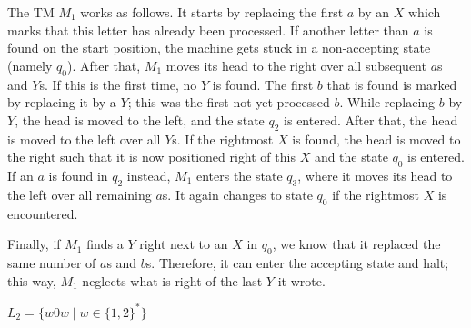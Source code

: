 \documentclass{exercise}
\begin{document}
\begin{solution}
\begin{center}
    \end{center}
    The TM $M_1$ works as follows.  It starts by replacing the first $a$ by an
    $X$ which marks that this letter has already been processed.  If another
    letter than $a$ is found on the start position, the machine gets stuck in a
    non-accepting state (namely $q_0$).  After that, $M_1$ moves its head to the
    right over all subsequent $a$s and $Y$s.  If this is the first time, no $Y$
    is found.  The first $b$ that is found is marked by
    replacing it by a $Y$; this was the first not-yet-processed $b$.  While
    replacing $b$ by $Y$, the head is moved to the left, and the state
    $q_2$ is entered.  After that, the head is moved to the left over all $Y$s.
    If the rightmost $X$ is found, the head is moved to the right such that it
    is now positioned right of this $X$ and the state $q_0$ is entered.
    If an $a$ is found in $q_2$ instead, $M_1$ enters the state $q_3$, where it
    moves its head to the left over all remaining $a$s.  It again changes to 
    state $q_0$ if the rightmost $X$ is encountered.
  
    Finally, if $M_1$ finds a $Y$ right next to an $X$ in $q_0$, we know that it
    replaced the same number of $a$s and $b$s.  Therefore, it can enter the
    accepting state and halt; this way, $M_1$ neglects what is right of the last
    $Y$ it wrote.
  \end{solution}

\subtask $L_2 = \{ w0w \mid w \in\{1,2\}^* \}$
\end{document}
